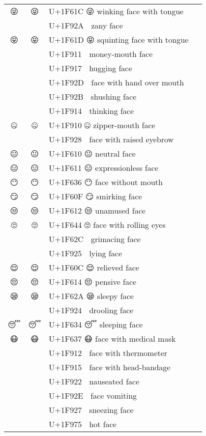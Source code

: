 \documentclass[a4paper,12pt]{article}
\newcommand{\fontA}[1]{{\fontspec[RawFeature={dist,ccmp}]{Segoe UI Emoji} #1}}
\newcommand{\fontB}[1]{{\fontspec[Ligatures=Common,RawFeature={+ccmp}]{Symbola_Hinted.ttf} #1}}
\begin{document}
\begin{longtable}[c]{ccp{0.8\linewidth}}
\fontA{😜}&\fontB{😜}&U+1F61C 😜 winking face with tongue\\
\fontA{🤪}&\fontB{🤪}&U+1F92A 🤪 zany face\\
\fontA{😝}&\fontB{😝}&U+1F61D 😝 squinting face with tongue\\
\fontA{🤑}&\fontB{🤑}&U+1F911 🤑 money-mouth face\\
\fontA{🤗}&\fontB{🤗}&U+1F917 🤗 hugging face\\
\fontA{🤭}&\fontB{🤭}&U+1F92D 🤭 face with hand over mouth\\
\fontA{🤫}&\fontB{🤫}&U+1F92B 🤫 shushing face\\
\fontA{🤔}&\fontB{🤔}&U+1F914 🤔 thinking face\\
\fontA{🤐}&\fontB{🤐}&U+1F910 🤐 zipper-mouth face\\
\fontA{🤨}&\fontB{🤨}&U+1F928 🤨 face with raised eyebrow\\
\fontA{😐}&\fontB{😐}&U+1F610 😐 neutral face\\
\fontA{😑}&\fontB{😑}&U+1F611 😑 expressionless face\\
\fontA{😶}&\fontB{😶}&U+1F636 😶 face without mouth\\
\fontA{😏}&\fontB{😏}&U+1F60F 😏 smirking face\\
\fontA{😒}&\fontB{😒}&U+1F612 😒 unamused face\\
\fontA{🙄}&\fontB{🙄}&U+1F644 🙄 face with rolling eyes\\
\fontA{😬}&\fontB{😬}&U+1F62C 😬 grimacing face\\
\fontA{🤥}&\fontB{🤥}&U+1F925 🤥 lying face\\
\fontA{😌}&\fontB{😌}&U+1F60C 😌 relieved face\\
\fontA{😔}&\fontB{😔}&U+1F614 😔 pensive face\\
\fontA{😪}&\fontB{😪}&U+1F62A 😪 sleepy face\\
\fontA{🤤}&\fontB{🤤}&U+1F924 🤤 drooling face\\
\fontA{😴}&\fontB{😴}&U+1F634 😴 sleeping face\\
\fontA{😷}&\fontB{😷}&U+1F637 😷 face with medical mask\\
\fontA{🤒}&\fontB{🤒}&U+1F912 🤒 face with thermometer\\
\fontA{🤕}&\fontB{🤕}&U+1F915 🤕 face with head-bandage\\
\fontA{🤢}&\fontB{🤢}&U+1F922 🤢 nauseated face\\
\fontA{🤮}&\fontB{🤮}&U+1F92E 🤮 face vomiting\\
\fontA{🤧}&\fontB{🤧}&U+1F927 🤧 sneezing face\\
\fontA{🥵}&\fontB{🥵}&U+1F975 🥵 hot face\\

\end{longtable}
\end{document}
